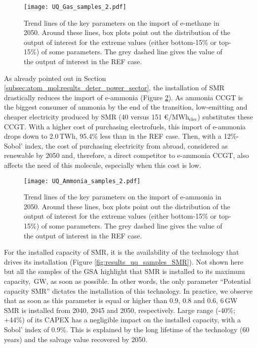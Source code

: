 \begin{figure}[htbp!]
\centering
\texttt{[image: UQ\_Gas\_samples\_2.pdf]}
\caption{Trend lines of the key parameters on the import of e-methane in 2050. Around these lines, box plots point out the distribution of the output of interest for the extreme values (either bottom-15\% or top-15\%) of some parameters. The grey dashed line gives the value of the output of interest in the REF case. }
\label{fig:results_uq_samples_gas}
\end{figure}

As already pointed out in Section \ref{subsec:atom_mol:results_deter_power_sector}, the installation of \gls{SMR} drastically reduces the import of e-ammonia (Figure \ref{fig:results_uq_samples_ammonia}). As ammonia \gls{CCGT} is the biggest consumer of ammonia by the end of the transition, low-emitting and cheaper electricity produced by \gls{SMR} (40 versus 151 €/MWh$_{\text{elec}}$) substitutes these \gls{CCGT}. With a higher cost of purchasing electrofuels, this import of e-ammonia drops down to 2.0\,TWh, 95.4\% less than in the REF case. Then, with a 12\%-Sobol' index, the cost of purchasing electricity from abroad, considered as renewable by 2050 and, therefore, a direct competitor to e-ammonia \gls{CCGT}, also affects the need of this molecule, especially when this cost is low.

\begin{figure}[htbp!]
\centering
\texttt{[image: UQ\_Ammonia\_samples\_2.pdf]}
\caption{Trend lines of the key parameters on the import of e-ammonia in 2050. Around these lines, box plots point out the distribution of the output of interest for the extreme values (either bottom-15\% or top-15\%) of some parameters. The grey dashed line gives the value of the output of interest in the REF case. }
\label{fig:results_uq_samples_ammonia}
\end{figure}

For the installed capacity of \gls{SMR}, it is the availability of the technology that drives its installation (Figure \ref{fig:results_uq_samples_SMR}). Not shown here but all the samples of the \gls{GSA} highlight that \gls{SMR} is installed to its maximum capacity, \,GW, as soon as possible. In other words, the only parameter ``Potential capacity \gls{SMR}'' dictates the installation of this technology. In practice, we observe that as soon as this parameter is equal or higher than 0.9, 0.8 and 0.6, 6\,GW \gls{SMR} is installed from 2040, 2045 and 2050, respectively. Large range (-40\%; +44\%) of its CAPEX has a negligible impact on the installed capacity, with a Sobol' index of 0.9\%. This is explained by the long lifetime of the technology (60 years) and the salvage value recovered by 2050.

